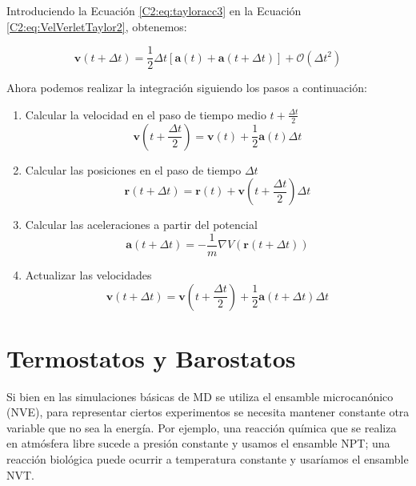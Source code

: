 Introduciendo la Ecuación \ref{C2:eq:tayloracc3} en la Ecuación \ref{C2:eq:VelVerletTaylor2}, obtenemos:

\begin{equation}
\mathbf{v}(t+\Delta{}t) = \frac{1}{2}\Delta{}t\left[\mathbf{a}(t)+\mathbf{a}(t+\Delta{}t)\right] + \mathcal{O}(\Delta{}t^{2})
\label{C2:eq:VelVerletTaylor3}
\end{equation}

Ahora podemos realizar la integración siguiendo los pasos a continuación:

\begin{enumerate}
	\item Calcular la velocidad en el paso de tiempo medio $t+\frac{\Delta{}t}{2}$
	\begin{equation}
	\mathbf{v}\left(t+\frac{\Delta{}t}{2}\right) = \mathbf{v}(t) + \frac{1}{2}\mathbf{a}(t)\Delta{}t
	\end{equation}
	\item Calcular las posiciones en el paso de tiempo $\Delta{}t$
	\begin{equation}
	\mathbf{r}(t+\Delta{}t) = \mathbf{r}(t) + \mathbf{v}\left(t+\frac{\Delta{}t}{2}\right)\Delta{}t
	\end{equation}
	\item Calcular las aceleraciones a partir del potencial
	\begin{equation}
	\mathbf{a}(t+\Delta{}t) = -\frac{1}{m}\nabla{}V\left(\mathbf{r}(t+\Delta{}t)\right)
	\end{equation}
	\item Actualizar las velocidades
	\begin{equation}
	\mathbf{v}(t+\Delta{}t) = \mathbf{v}\left(t+\frac{\Delta{}t}{2}\right) + \frac{1}{2}\mathbf{a}\left(t + \Delta{}t\right)\Delta{}t
	\end{equation}
\end{enumerate}

\section{Termostatos y Barostatos}
\label{S2_5}

Si bien en las simulaciones básicas de MD se utiliza el ensamble microcanónico (NVE), para representar ciertos experimentos se necesita mantener constante otra variable que no sea la energía. Por ejemplo, una reacción química que se realiza en atmósfera libre sucede a presión constante y usamos el ensamble NPT; una reacción biológica puede ocurrir a temperatura constante y usaríamos el ensamble NVT.

